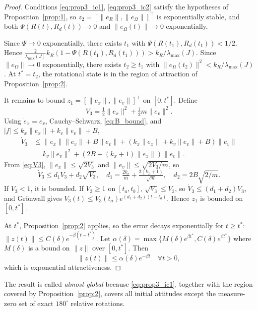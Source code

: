 \documentclass[11pt]{article}
\theoremstyle{remark}
\newcommand{\lmax}{\lambda_{\max}}
\begin{document}
\begin{proof}
Conditions \eqref{eq:prop3_ic1}, \eqref{eq:prop3_ic2} satisfy the hypotheses of Proposition~\ref{prop:1}, so $z_2 = [\|e_R\|,\|e_\Omega\|]^\top$ is exponentially stable, and both $\Psi(R(t),R_d(t)) \to 0$ and $\|e_\Omega(t)\| \to 0$ exponentially.

Since $\Psi \to 0$ exponentially, there exists $t_1$ with $\Psi(R(t_1),R_d(t_1)) < 1/2$. Hence $\tfrac{2}{\lmax(J)}k_R(1-\Psi(R(t_1),R_d(t_1))) > k_R/\lmax(J)$. Since $\|e_\Omega\| \to 0$ exponentially, there exists $t_2 \ge t_1$ with $\|e_\Omega(t_2)\|^2 < k_R/\lmax(J)$. At $t^* = t_2$, the rotational state is in the region of attraction of Proposition~\ref{prop:2}.

It remains to bound $z_1 = [\|e_x\|,\|e_v\|]^\top$ on $[0, t^*]$. Define
\begin{equation}
V_3 = \tfrac{1}{2}\|e_x\|^2 + \tfrac{1}{2}m\|e_v\|^2.
\label{eq:V3}
\end{equation}
Using $\dot e_x = e_v$, Cauchy--Schwarz, \eqref{eq:B_bound}, and $|f| \le k_x\|e_x\| + k_v\|e_v\| + B$,
\begin{align*}
\dot V_3
&\le \|e_x\|\|e_v\| + B\|e_v\| + (k_x\|e_x\|+k_v\|e_v\|+B)\|e_v\|\\
&= k_v\|e_v\|^2 + (2B + (k_x+1)\|e_x\|)\|e_v\|.
\end{align*}
From \eqref{eq:V3}, $\|e_x\| \le \sqrt{2V_3}$ and $\|e_v\| \le \sqrt{2V_3/m}$, so
\[
\dot V_3 \le d_1 V_3 + d_2\sqrt{V_3},\quad d_1 = \tfrac{2k_v}{m} + \tfrac{2(k_x+1)}{\sqrt{m}},\quad d_2 = 2B\sqrt{2/m}.
\]
If $V_3 < 1$, it is bounded. If $V_3 \ge 1$ on $[t_a,t_b]$, $\sqrt{V_3} \le V_3$, so $\dot V_3 \le (d_1+d_2)V_3$, and Gr\"onwall gives $V_3(t) \le V_3(t_a)e^{(d_1+d_2)(t-t_a)}$. Hence $z_1$ is bounded on $[0,t^*]$.

At $t^*$, Proposition~\ref{prop:2} applies, so the error decays exponentially for $t \ge t^*$: $\|z(t)\| \le C(\delta)e^{-\beta(t-t^*)}$. Let $\alpha(\delta) = \max\{M(\delta)e^{\beta t^*}, C(\delta)e^{\beta t^*}\}$ where $M(\delta)$ is a bound on $\|z\|$ over $[0,t^*]$. Then
\[
\|z(t)\| \le \alpha(\delta)e^{-\beta t}\quad \forall t>0,
\]
which is exponential attractiveness.
\end{proof}

The result is called \emph{almost global} because \eqref{eq:prop3_ic1}, together with the region covered by Proposition~\ref{prop:2}, covers all initial attitudes except the measure-zero set of exact $180^\circ$ relative rotations.

\newpage
\end{document}
